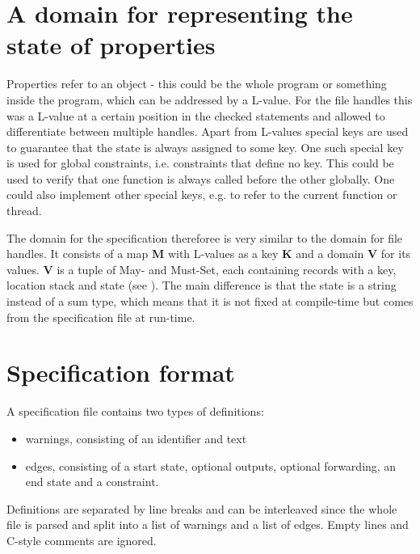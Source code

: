 \section{A domain for representing the state of properties}
Properties refer to an object - this could be the whole program or something inside the program, which can be addressed by a L-value. For the file handles this was a L-value at a certain position in the checked statements and allowed to differentiate between multiple handles.
Apart from L-values special keys are used to guarantee that the state is always assigned to some key.
One such special key is used for global constraints, i.e. constraints that define no key. This could be used to verify that one function is always called before the other globally. One could also implement other special keys, e.g. to refer to the current function or thread.

The domain for the specification thereforee is very similar to the domain for file handles. It consists of a map \textbf{M} with L-values as a key \textbf{K} and a domain \textbf{V} for its values. \textbf{V} is a tuple of May- and Must-Set, each containing records with a key, location stack and state (see ).
The main difference is that the state is a string instead of a sum type, which means that it is not fixed at compile-time but comes from the specification file at run-time.


\section{Specification format}
A specification file contains two types of definitions:
\begin{itemize}
\item warnings, consisting of an identifier and text
\item edges, consisting of a start state, optional outputs, optional forwarding, an end state and a constraint.
\end{itemize}
Definitions are separated by line breaks and can be interleaved since the whole file is parsed and split into a list of warnings and a list of edges. Empty lines and C-style comments are ignored.

